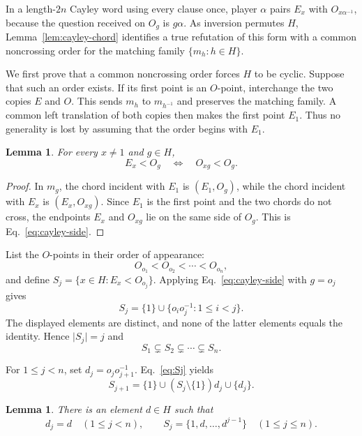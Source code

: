 \documentclass[11pt]{article}
\newtheorem{lemma}[theorem]{Lemma}
\theoremstyle{definition}
\theoremstyle{remark}
\numberwithin{equation}{section}
\begin{document}
In a length-\(2n\) Cayley word using every clause once, player \(\alpha\)
pairs \(E_x\) with \(O_{x\alpha^{-1}}\), because the question received on
\(O_g\) is \(g\alpha\).  As inversion permutes \(H\),
Lemma~\ref{lem:cayley-chord} identifies a true refutation of this form with a
common noncrossing order for the matching family \(\{m_h:h\in H\}\).

We first prove that a common noncrossing order forces \(H\) to be cyclic.
Suppose that such an order exists.  If its first
point is an \(O\)-point, interchange the two copies \(E\) and \(O\).
This sends \(m_h\) to \(m_{h^{-1}}\) and preserves the matching family.
A common left translation of both copies then makes the first point \(E_1\).
Thus no generality is lost by assuming that the order begins with \(E_1\).

\begin{lemma}\label{lem:cayley-side}
For every \(x\ne1\) and \(g\in H\),
\begin{equation}\label{eq:cayley-side}
  E_x<O_g
  \quad\Longleftrightarrow\quad
  O_{xg}<O_g.
\end{equation}
\end{lemma}

\begin{proof}
In \(m_g\), the chord incident with \(E_1\) is
\((E_1,O_g)\), while the chord incident with \(E_x\) is
\((E_x,O_{xg})\).  Since \(E_1\) is the first point and the two chords do
not cross, the endpoints \(E_x\) and \(O_{xg}\) lie on the same side of
\(O_g\).  This is Eq.~\eqref{eq:cayley-side}.
\end{proof}

List the \(O\)-points in their order of appearance:
\[
  O_{o_1}<O_{o_2}<\cdots<O_{o_n},
\]
and define \(S_j=\{x\in H:E_x<O_{o_j}\}\).  Applying
Eq.~\eqref{eq:cayley-side} with \(g=o_j\) gives
\begin{equation}\label{eq:Sj}
  S_j=\{1\}\cup\{o_i o_j^{-1}:1\leq i<j\}.
\end{equation}
The displayed elements are distinct, and none of the latter elements equals
the identity.  Hence \(\lvert S_j\rvert=j\) and
\[
  S_1\subsetneq S_2\subsetneq\cdots\subsetneq S_n.
\]

For \(1\leq j<n\), set \(d_j=o_j o_{j+1}^{-1}\).
Eq.~\eqref{eq:Sj} yields
\begin{equation}\label{eq:Sj-recurrence}
  S_{j+1}
  =
  \{1\}\cup(S_j\setminus\{1\})d_j\cup\{d_j\}.
\end{equation}

\begin{lemma}\label{lem:cayley-generator}
There is an element \(d\in H\) such that
\[
  d_j=d\quad(1\leq j<n),
  \qquad
  S_j=\{1,d,\ldots,d^{j-1}\}\quad(1\leq j\leq n).
\]
\end{lemma}
\end{document}
